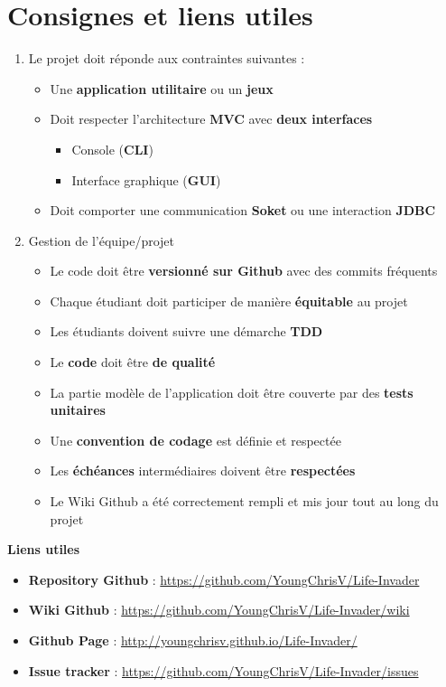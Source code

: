 \chapter*{Consignes et liens utiles}
\label{chap:Consignes}

\begin{enumerate}[I]
    \item Le projet doit réponde aux contraintes suivantes :
    \begin{itemize}
        \item Une \textbf{application utilitaire} ou un \textbf{jeux}
        \item Doit respecter l'architecture \textbf{MVC} avec \textbf{deux interfaces}
        \begin{itemize}
            \item Console (\textbf{CLI})
            \item Interface graphique (\textbf{GUI})
        \end{itemize}
        \item Doit comporter une communication \textbf{Soket} ou une interaction \textbf{JDBC}
    \end{itemize}   
    \item Gestion de l'équipe/projet
    \begin{itemize}
        \item Le code doit être  \textbf{versionné sur Github} avec des commits fréquents
        \item Chaque étudiant doit participer de manière \textbf{équitable} au projet
        \item Les étudiants doivent suivre une démarche \textbf{TDD}
        \item Le \textbf{code} doit être \textbf{de qualité}
        \item La partie modèle de l'application doit être couverte par des \textbf{tests unitaires}
        \item Une \textbf{convention de codage} est définie et respectée
        \item Les \textbf{échéances} intermédiaires doivent être \textbf{respectées}
        \item Le Wiki Github a été correctement rempli et mis jour tout au long du projet
        \end{itemize}
\end{enumerate}

\textbf{Liens utiles}
\begin{itemize}
    \item \textbf{Repository Github} : \url{https://github.com/YoungChrisV/Life-Invader}
    \item \textbf{Wiki Github} : \url{https://github.com/YoungChrisV/Life-Invader/wiki}
    \item \textbf{Github Page} : \url{http://youngchrisv.github.io/Life-Invader/}
    \item \textbf{Issue tracker} : \url{https://github.com/YoungChrisV/Life-Invader/issues}
\end{itemize}

\tableofcontents

\clearpage



